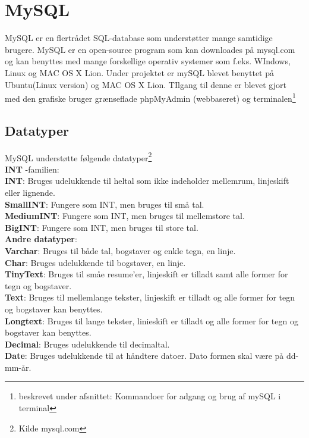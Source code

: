 \section*{MySQL}
MySQL er en flertrådet SQL-database som understøtter mange samtidige brugere. MySQL er en open-source program som kan downloades på mysql.com og kan benyttes med mange forskellige operativ systemer som f.eks. WIndows, Linux og MAC OS X Lion.
Under projektet er mySQL blevet benyttet på Ubuntu(Linux version) og MAC OS X Lion. TIlgang til denne er blevet gjort med den grafiske bruger grænseflade phpMyAdmin (webbaseret) og terminalen\footnote{beskrevet under afsnittet: Kommandoer for adgang og brug af mySQL i terminal}

\subsection*{Datatyper}
MySQL understøtte følgende datatyper\footnote{Kilde mysql.com} \\
\textbf{INT} -familien:\\
\textbf{INT}: Bruges udelukkende til heltal som ikke indeholder mellemrum, linjeskift eller lignende.\\
\textbf{SmallINT}: Fungere som INT, men bruges til små tal.\\
\textbf{MediumINT}: Fungere som INT, men bruges til mellemstore tal.\\
\textbf{BigINT}: Fungere som INT, men bruges til store tal.\\

\textbf{Andre datatyper}:\\
\textbf{Varchar}: Bruges til både tal, bogstaver og enkle tegn, en linje.\\
\textbf{Char}: Bruges udelukkende til bogstaver, en linje.\\
\textbf{TinyText}: Bruges til småe resume'er, linjeskift er tilladt samt alle former for tegn og bogstaver.\\
\textbf{Text}: Bruges til mellemlange  tekster, linjeskift er tilladt og alle former for tegn og bogstaver kan benyttes.\\
\textbf{Longtext}: Bruges til lange tekster, linieskift er tilladt og alle former for tegn og bogstaver kan benyttes.\\
\textbf{Decimal}: Bruges udelukkende til decimaltal.\\
\textbf{Date}: Bruges udelukkende til at håndtere datoer. Dato formen skal være på dd-mm-år.\\

